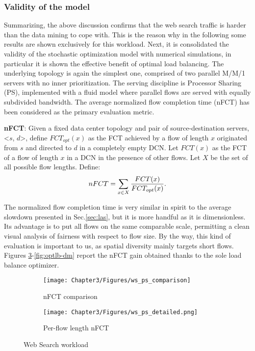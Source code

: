 \subsubsection{Validity of the model}
Summarizing, the above discussion confirms that the web search traffic is harder than the data mining to cope with. This is the reason why in the following some results are shown exclusively for this workload. 
Next, it is consolidated the validity of the stochastic optimization model with numerical simulations, in particular it is shown the effective benefit of optimal load balancing. The underlying topology is again the simplest one, comprised of two parallel M/M/1 servers with no inner prioritization. The serving discipline is Processor Sharing (PS), implemented with a fluid model where parallel flows are served with equally subdivided bandwidth. 
The average normalized flow completion time (nFCT) has been considered as the primary evaluation metric.
\begin{tcolorbox}
	\textbf{nFCT}: Given a fixed data center topology and pair of source-destination servers, <$s$, $d$>, define $FCT_{opt}(x)$ as the FCT achieved by a flow of length $x$ originated from $s$ and directed to $d$ in a completely empty DCN. Let $FCT(x)$ as the FCT of a flow of length $x$ in a DCN in the presence of other flows. Let $X$ be the set of all possible flow lengths. Define:
	\[
	nFCT = \sum_{x \in X} \small \frac{FCT(x)}{FCT_{opt}(x)} \normalsize.
	\]
\end{tcolorbox}
The normalized flow completion time is very similar in spirit to the average slowdown presented in Sec.\ref{sec:las}, but it is more handful as it is dimensionless. Its advantage is to put all flows on the same comparable scale, permitting a clean visual analysis of fairness with respect to flow size. By the way, this kind of evaluation is important to us, as spatial diversity mainly targets short flows. \\
Figures \ref{fig:optlb-ws}-\ref{fig:optlb-dm} report the nFCT gain obtained thanks to the sole load balance optimizer. 
\begin{figure}
	\centering
	\begin{subfigure}{.5\textwidth}
		\centering
		\texttt{[image: Chapter3/Figures/ws\_ps\_comparison]}
		\caption{nFCT comparison}
		\label{fig:optlbgain-ws}
	\end{subfigure}%
	\begin{subfigure}{.5\textwidth}
		\centering
		\texttt{[image: Chapter3/Figures/ws\_ps\_detailed.png]}
		\caption{Per-flow length nFCT}
		\label{fig:optlbgainvsflowsize-ws}
	\end{subfigure}
	\caption{Web Search workload}
	\label{fig:optlb-ws}
\end{figure}
